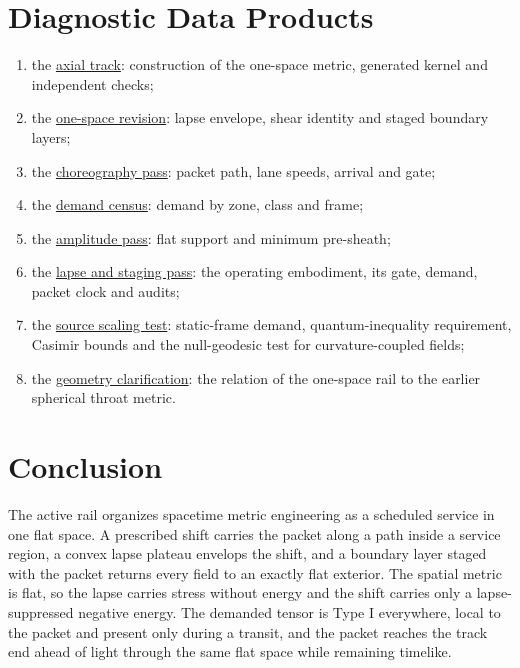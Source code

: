 \documentclass[11pt]{article}
\begin{document}
\section{Diagnostic Data Products}

\begin{enumerate}
\item the \href{supporting_reports/AXIAL_TRACK.md}{axial track}: construction of the one-space metric, generated kernel and independent checks;
\item the \href{supporting_reports/ONE_SPACE_REVISION.md}{one-space revision}: lapse envelope, shear identity and staged boundary layers;
\item the \href{supporting_reports/CHOREOGRAPHY_PASS.md}{choreography pass}: packet path, lane speeds, arrival and gate;
\item the \href{supporting_reports/DEMAND_CENSUS.md}{demand census}: demand by zone, class and frame;
\item the \href{supporting_reports/AMPLITUDE_PASS.md}{amplitude pass}: flat support and minimum pre-sheath;
\item the \href{supporting_reports/LAPSE_AND_STAGING_PASS.md}{lapse and staging pass}: the operating embodiment, its gate, demand, packet clock and audits;
\item the \href{supporting_reports/SOURCE_SCALING_TEST.md}{source scaling test}: static-frame demand, quantum-inequality requirement, Casimir bounds and the null-geodesic test for curvature-coupled fields;
\item the \href{supporting_reports/THROAT_GEOMETRY_CLARIFICATION.md}{geometry clarification}: the relation of the one-space rail to the earlier spherical throat metric.
\end{enumerate}

\section{Conclusion}

The active rail organizes spacetime metric engineering as a scheduled service in one flat space. A prescribed shift carries the packet along a path inside a service region, a convex lapse plateau envelops the shift, and a boundary layer staged with the packet returns every field to an exactly flat exterior. The spatial metric is flat, so the lapse carries stress without energy and the shift carries only a lapse-suppressed negative energy. The demanded tensor is Type I everywhere, local to the packet and present only during a transit, and the packet reaches the track end ahead of light through the same flat space while remaining timelike.
\end{document}
